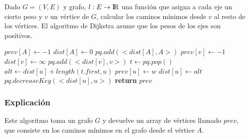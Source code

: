 Dado $G = (V, E)$ y grafo, $l: E \rightarrow {\rm I\!R}$ una funci\'on que asigna a cada eje un cierto peso y $v$ un v\'ertice de $G$, calcular los caminos m\'inimos desde $v$ al resto de los v\'ertices. El algoritmo de Dijkstra asume que los pesos de los ejes son positivos.

\begin{algorithm}
\begin{algorithmic}[1]
  \State $prev[A] \gets -1$
  \State $dist[A] \gets 0$
  \State $pq.add(<dist[A], A>)$
    \State $prev[v] \gets -1$
    \State $dist[v] \gets \infty$
    \State $pq.add(<dist[v], v>)$
  \EndFor
    \State $t \gets pq.pop()$
      \State $alt \gets dist[u] + length(t.first, u)$
        \State $prev[u] \gets w$
        \State $dist[u] \gets alt$
        \State $pq.decreaseKey(<dist[u], u>)$
      \EndIf
    \EndFor
  \EndWhile
  \State \textbf{return} $prev$
\EndFunction
\end{algorithmic}
\end{algorithm}

\subsubsection*{Explicaci\'on}

Este algoritmo toma un grafo $G$ y devuelve un array de v\'ertices llamado $prev$, que consiste en los caminos m\'inimos en el grafo desde el v\'ertice $A$.

